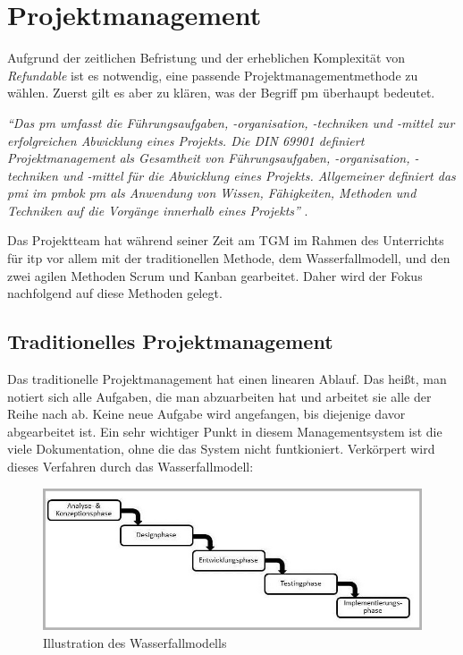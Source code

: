 \chapter{Projektmanagement}
Aufgrund der zeitlichen Befristung und der erheblichen Komplexität von \textit{Refundable} ist es notwendig, eine passende Projektmanagementmethode zu wählen. Zuerst gilt es aber zu klären, was der Begriff \Gls{pm} überhaupt bedeutet.\\
\begin{center}
	\textit{\enquote{Das \Gls{pm} umfasst die Führungsaufgaben, -organisation, -techniken und -mittel zur erfolgreichen Abwicklung eines Projekts. Die DIN 69901 definiert Projektmanagement als Gesamtheit von Führungsaufgaben, -organisation, -techniken und -mittel für die Abwicklung eines Projekts. Allgemeiner definiert das \Gls{pmi} im \Gls{pmbok} \Gls{pm} als Anwendung von Wissen, Fähigkeiten, Methoden und Techniken auf die Vorgänge innerhalb eines Projekts}} \cite{pm-definition}.
\end{center}
Das Projektteam hat während seiner Zeit am TGM im Rahmen des Unterrichts für \Gls{itp} vor allem mit der traditionellen Methode, dem Wasserfallmodell, und den zwei agilen Methoden Scrum und Kanban gearbeitet. Daher wird der Fokus nachfolgend auf diese Methoden gelegt.
\newpage
\section{Traditionelles Projektmanagement}
\label{chapter:tradi-pm}
Das traditionelle Projektmanagement hat einen linearen Ablauf. Das heißt, man notiert sich alle Aufgaben, die man abzuarbeiten hat und arbeitet sie alle der Reihe nach ab. Keine neue Aufgabe wird angefangen, bis diejenige davor abgearbeitet ist. Ein sehr wichtiger Punkt in diesem Managementsystem ist die viele Dokumentation, ohne die das System nicht funtkioniert. Verkörpert wird dieses Verfahren durch das Wasserfallmodell:
\begin{figure}[H]
	\centering
	\includegraphics[width=0.7\linewidth]{images/projektmanagement/wasserfallmodell}
	\caption[Wasserfallmodell]{Illustration des Wasserfallmodells \cite{pm-wasserfall-online}}
	\label{fig:wasserfall}
\end{figure}
